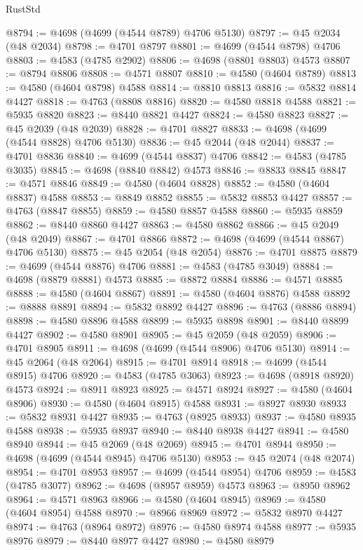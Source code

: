\begin{lexlean}{RustStd}
\begin{coremodule}
@8794 := @4698 (@4699 (@4544 @8789) @4706 @5130)
@8797 := @45 @2034 (@48 @2034)
@8798 := @4701 @8797
@8801 := @4699 (@4544 @8798) @4706
@8803 := @4583 (@4785 @2902)
@8806 := @4698 (@8801 @8803) @4573
@8807 := @8794 @8806
@8808 := @4571 @8807
@8810 := @4580 (@4604 @8789)
@8813 := @4580 (@4604 @8798) @4588
@8814 := @8810 @8813
@8816 := @5832 @8814 @4427
@8818 := @4763 (@8808 @8816)
@8820 := @4580 @8818 @4588
@8821 := @5935 @8820
@8823 := @8440 @8821 @4427
@8824 := @4580 @8823
@8827 := @45 @2039 (@48 @2039)
@8828 := @4701 @8827
@8833 := @4698 (@4699 (@4544 @8828) @4706 @5130)
@8836 := @45 @2044 (@48 @2044)
@8837 := @4701 @8836
@8840 := @4699 (@4544 @8837) @4706
@8842 := @4583 (@4785 @3035)
@8845 := @4698 (@8840 @8842) @4573
@8846 := @8833 @8845
@8847 := @4571 @8846
@8849 := @4580 (@4604 @8828)
@8852 := @4580 (@4604 @8837) @4588
@8853 := @8849 @8852
@8855 := @5832 @8853 @4427
@8857 := @4763 (@8847 @8855)
@8859 := @4580 @8857 @4588
@8860 := @5935 @8859
@8862 := @8440 @8860 @4427
@8863 := @4580 @8862
@8866 := @45 @2049 (@48 @2049)
@8867 := @4701 @8866
@8872 := @4698 (@4699 (@4544 @8867) @4706 @5130)
@8875 := @45 @2054 (@48 @2054)
@8876 := @4701 @8875
@8879 := @4699 (@4544 @8876) @4706
@8881 := @4583 (@4785 @3049)
@8884 := @4698 (@8879 @8881) @4573
@8885 := @8872 @8884
@8886 := @4571 @8885
@8888 := @4580 (@4604 @8867)
@8891 := @4580 (@4604 @8876) @4588
@8892 := @8888 @8891
@8894 := @5832 @8892 @4427
@8896 := @4763 (@8886 @8894)
@8898 := @4580 @8896 @4588
@8899 := @5935 @8898
@8901 := @8440 @8899 @4427
@8902 := @4580 @8901
@8905 := @45 @2059 (@48 @2059)
@8906 := @4701 @8905
@8911 := @4698 (@4699 (@4544 @8906) @4706 @5130)
@8914 := @45 @2064 (@48 @2064)
@8915 := @4701 @8914
@8918 := @4699 (@4544 @8915) @4706
@8920 := @4583 (@4785 @3063)
@8923 := @4698 (@8918 @8920) @4573
@8924 := @8911 @8923
@8925 := @4571 @8924
@8927 := @4580 (@4604 @8906)
@8930 := @4580 (@4604 @8915) @4588
@8931 := @8927 @8930
@8933 := @5832 @8931 @4427
@8935 := @4763 (@8925 @8933)
@8937 := @4580 @8935 @4588
@8938 := @5935 @8937
@8940 := @8440 @8938 @4427
@8941 := @4580 @8940
@8944 := @45 @2069 (@48 @2069)
@8945 := @4701 @8944
@8950 := @4698 (@4699 (@4544 @8945) @4706 @5130)
@8953 := @45 @2074 (@48 @2074)
@8954 := @4701 @8953
@8957 := @4699 (@4544 @8954) @4706
@8959 := @4583 (@4785 @3077)
@8962 := @4698 (@8957 @8959) @4573
@8963 := @8950 @8962
@8964 := @4571 @8963
@8966 := @4580 (@4604 @8945)
@8969 := @4580 (@4604 @8954) @4588
@8970 := @8966 @8969
@8972 := @5832 @8970 @4427
@8974 := @4763 (@8964 @8972)
@8976 := @4580 @8974 @4588
@8977 := @5935 @8976
@8979 := @8440 @8977 @4427
@8980 := @4580 @8979

\end{coremodule}
\end{lexlean}

